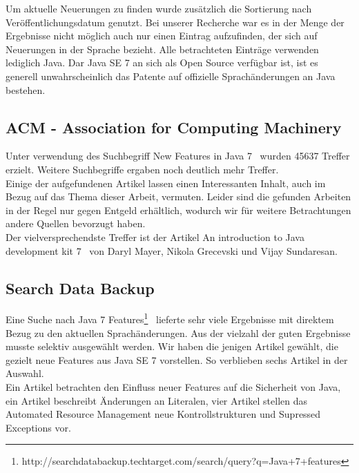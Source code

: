Um aktuelle Neuerungen zu finden wurde zusätzlich die Sortierung nach Veröffentlichungsdatum genutzt. Bei unserer Recherche war es in der Menge der Ergebnisse nicht möglich auch nur einen Eintrag aufzufinden, der sich auf Neuerungen in der Sprache bezieht. Alle betrachteten Einträge verwenden lediglich Java. Dar Java SE 7 an sich als Open Source verfügbar ist, ist es generell unwahrscheinlich das Patente auf offizielle Sprachänderungen an Java bestehen.\\

\subsection{ACM - Association for Computing Machinery}
Unter verwendung des Suchbegriff \glqq New Features in Java 7 \grqq ~wurden 45637 Treffer erzielt.
Weitere Suchbegriffe ergaben noch deutlich mehr Treffer.\\

Einige der aufgefundenen Artikel lassen einen Interessanten Inhalt, auch im Bezug auf das Thema dieser Arbeit, vermuten. Leider sind die gefunden Arbeiten in der Regel nur gegen Entgeld erhältlich, wodurch wir für weitere Betrachtungen andere Quellen bevorzugt haben.\\

Der vielversprechendste Treffer ist der Artikel \glqq An introduction to Java development kit 7 \grqq\cite{acmJava7} ~von Daryl Mayer, Nikola Grecevski und Vijay Sundaresan.

\subsection{Search Data Backup}
Eine Suche nach \glqq Java 7 Features\grqq\footnote{http://searchdatabackup.techtarget.com/search/query?q=Java+7+features} ~lieferte sehr viele Ergebnisse mit direktem Bezug zu den aktuellen Sprachänderungen. Aus der vielzahl der guten Ergebnisse musste selektiv ausgewählt werden. Wir haben die jenigen Artikel gewählt, die gezielt neue Features aus Java SE 7 vorstellen. So verblieben sechs Artikel in der Auswahl.\\

Ein Artikel\cite{sbJ7ImproveSec} betrachten den Einfluss neuer Features auf die Sicherheit von Java, ein Artikel\cite{sbJ7literals} beschreibt Änderungen an Literalen, vier Artikel stellen das Automated Resource Management\cite{sbJ7resources}\cite{sbJ7coin} neue Kontrollstrukturen\cite{sbJ7switch} und Supressed Exceptions\cite{sbJ7exeptions} vor.
%

